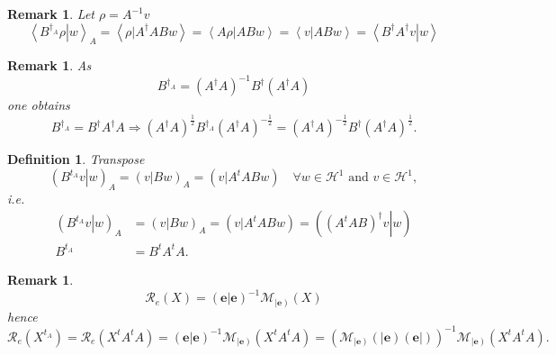 \documentclass[aps,preprint]{revtex4}%
\newtheorem{definition}[theorem]{Definition}
\newtheorem{remark}[theorem]{Remark}
\begin{document}
\begin{remark}
Let $\rho=A^{-1}v$
\begin{equation}
\left\langle \left.  B^{\dagger_{A}}\rho\right\vert w\right\rangle
_{A}=\left\langle \left.  \rho\right\vert A^{\dagger}ABw\right\rangle
=\left\langle \left.  A\rho\right\vert ABw\right\rangle =\left\langle \left.
v\right\vert ABw\right\rangle =\left\langle \left.  B^{\dagger}A^{\dagger
}v\right\vert w\right\rangle
\end{equation}

\end{remark}

\begin{remark}
As%
\begin{equation}
B^{\dagger_{A}}=\left(  A^{\dagger}A\right)  ^{-1}B^{\dagger}\left(
A^{\dagger}A\right)
\end{equation}
one obtains
\begin{equation}
B^{\dagger_{A}}=B^{\dagger}A^{\dagger}A\Rightarrow\left(  A^{\dagger}A\right)
^{\frac{1}{2}}B^{\dagger_{A}}\left(  A^{\dagger}A\right)  ^{-\frac{1}{2}%
}=\left(  A^{\dagger}A\right)  ^{-\frac{1}{2}}B^{\dagger}\left(  A^{\dagger
}A\right)  ^{\frac{1}{2}}.
\end{equation}

\end{remark}

\begin{definition}
Transpose%
\begin{equation}
\left(  \left.  B^{t_{A}}v\right\vert w\right)  _{A}=\left(  \left.
v\right\vert Bw\right)  _{A}=\left(  \left.  v\right\vert A^{t}ABw\right)
\quad\forall w\in\mathcal{H}^{1}\text{ and }v\in\mathcal{H}^{1},
\end{equation}
i.e.
\begin{align}
\left(  \left.  B^{t_{A}}v\right\vert w\right)  _{A}  &  =\left(  \left.
v\right\vert Bw\right)  _{A}=\left(  \left.  v\right\vert A^{t}ABw\right)
=\left(  \left.  \left(  A^{t}AB\right)  ^{\dagger}v\right\vert w\right) \\
B^{t_{A}}  &  =B^{t}A^{t}A.
\end{align}

\end{definition}

\begin{remark}%
\begin{equation}
\mathcal{R}_{e}\left(  X\right)  =\left(  \left.  \mathbf{e}\right\vert
\mathbf{e}\right)  ^{-1}\mathcal{M}_{\left\vert \mathbf{e}\right)  }\left(
X\right)
\end{equation}
hence%
\begin{equation}
\mathcal{R}_{e}\left(  X^{t_{A}}\right)  =\mathcal{R}_{e}\left(  X^{t}%
A^{t}A\right)  =\left(  \left.  \mathbf{e}\right\vert \mathbf{e}\right)
^{-1}\mathcal{M}_{\left\vert \mathbf{e}\right)  }\left(  X^{t}A^{t}A\right)
=\left(  \mathcal{M}_{\left\vert \mathbf{e}\right)  }\left(  \left\vert
\mathbf{e}\right)  \left(  \mathbf{e}\right\vert \right)  \right)
^{-1}\mathcal{M}_{\left\vert \mathbf{e}\right)  }\left(  X^{t}A^{t}A\right)  .
\end{equation}

\end{remark}
\end{document}
